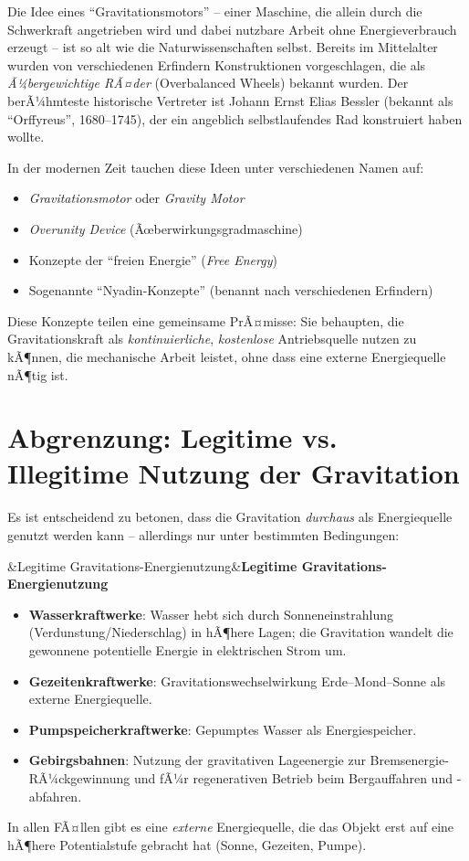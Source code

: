 ﻿\documentclass[12pt, a4paper]{report}
\newenvironment{hinweis}[1][]{%
  \begin{hinweisframe}\sloppy%
  \ifx&#1&\else\textbf{#1}\par\smallskip\fi}{\end{hinweisframe}}
\theoremstyle{definition}
\theoremstyle{remark}
\begin{document}
Die Idee eines ``Gravitationsmotors'' -- einer Maschine, die allein durch die
Schwerkraft angetrieben wird und dabei nutzbare Arbeit ohne Energieverbrauch
erzeugt -- ist so alt wie die Naturwissenschaften selbst. Bereits im Mittelalter
wurden von verschiedenen Erfindern Konstruktionen vorgeschlagen, die als
\emph{Ã¼bergewichtige RÃ¤der} (Overbalanced Wheels) bekannt wurden. Der berÃ¼hmteste
historische Vertreter ist Johann Ernst Elias Bessler (bekannt als ``Orffyreus'',
1680--1745), der ein angeblich selbstlaufendes Rad konstruiert haben wollte.

In der modernen Zeit tauchen diese Ideen unter verschiedenen Namen auf:
\begin{itemize}[leftmargin=2em]
  \item \emph{Gravitationsmotor} oder \emph{Gravity Motor}
  \item \emph{Overunity Device} (Ãœberwirkungsgradmaschine)
  \item Konzepte der ``freien Energie'' (\emph{Free Energy})
  \item Sogenannte ``Nyadin-Konzepte'' (benannt nach verschiedenen Erfindern)
\end{itemize}

Diese Konzepte teilen eine gemeinsame PrÃ¤misse: Sie behaupten, die Gravitationskraft
als \emph{kontinuierliche}, \emph{kostenlose} Antriebsquelle nutzen zu kÃ¶nnen, die
mechanische Arbeit leistet, ohne dass eine externe Energiequelle nÃ¶tig ist.

\section{Abgrenzung: Legitime vs. Illegitime Nutzung der Gravitation}

Es ist entscheidend zu betonen, dass die Gravitation \emph{durchaus} als Energiequelle
genutzt werden kann -- allerdings nur unter bestimmten Bedingungen:

\begin{hinweis}[Legitime Gravitations-Energienutzung]
  \begin{itemize}
    \item \textbf{Wasserkraftwerke}: Wasser hebt sich durch Sonneneinstrahlung
          (Verdunstung/Niederschlag) in hÃ¶here Lagen; die Gravitation
          wandelt die gewonnene potentielle Energie in elektrischen Strom um.
    \item \textbf{Gezeitenkraftwerke}: Gravitations\-wechsel\-wirkung
          Erde--Mond--Sonne als externe Energiequelle.
    \item \textbf{Pumpspeicherkraftwerke}: Gepumptes Wasser als Energiespeicher.
    \item \textbf{Gebirgsbahnen}: Nutzung der gravitativen Lageenergie
          zur Bremsenergie-RÃ¼ckgewinnung und fÃ¼r regenerativen Betrieb beim
          Berg\-auf\-fahren und -ab\-fahren.
  \end{itemize}
  In allen FÃ¤llen gibt es eine \emph{externe} Energiequelle, die das Objekt erst auf
  eine hÃ¶here Potentialstufe gebracht hat (Sonne, Gezeiten, Pumpe).
\end{hinweis}
\end{document}
